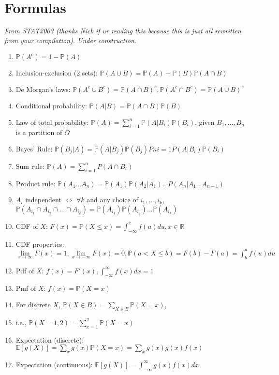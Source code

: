 \chapter{Formulas}


\textit{From STAT2003 (thanks Nick if ur reading this because this is just all rewritten from your compilation). Under construction.}

\begin{enumerate}
    \item \(\mathbb{P}(A^c)=1-\mathbb{P}(A)\)
    \item Inclusion-exclusion (2 sets): \(\mathbb{P}(A\cup B)=\mathbb{P}(A)+\mathbb{P}(B)\mathbb{P}(A\cap B)\)
    \item De Morgan’s laws: \(\mathbb{P}(A^c\cup B^c)=\mathbb{P}{(A\cap B)}^c, \mathbb{P}(A^c\cap B^c)=\mathbb{P}{(A\cup B)}^c\)
    \item Conditional probability: \(\mathbb{P}(A|B)=\mathbb{P}(A\cap B)\mathbb{P}(B)\)
    \item Law of total probability: \(\mathbb{P}(A)=\sum_{i=1}^n \mathbb{P}(A|B_i)\mathbb{P}(B_i)\), given \(B_1, \ldots,B_n\) is a partition of \(\Omega\)
    \item Bayes’ Rule: \(\mathbb{P}(B_j|A)=\mathbb{P}(A|B_j)\mathbb{P}(B_j)Pni=1P(A|B_i)\mathbb{P}(B_i)\)
    \item Sum rule: \(\mathbb{P}(A)=\sum_{i=1}^n P(A\cap B_i)\)
    \item Product rule: \(\mathbb{P}(A_1 \ldots A_n) = \mathbb{P}(A_1) \mathbb{P}(A_2|A_1) \ldots P(A_n | A_1\ldots A_{n-1})\)
    \item \(A_i\) independent \(\iff\) \(\forall k\) and any choice of \(i_1,\ldots,i_k\), \(\mathbb{P}(A_{i_1} \cap A_{i_2} \cap\ldots \cap A_{i_k})=\mathbb{P}(A_{i_1})\mathbb{P}(A_{i_2})\ldots\mathbb{P}(A_{i_k})\)
    \item CDF of \(X\): \(F(x)=\mathbb{P}(X\leq x)=\int_{-\infty}^{x} f(u)du, x\in \mathbb{R}\)
    \item CDF properties: \(\underset{x\to\infty}{\lim} F(x)=1, \underset{x\to-\infty}{\lim} F(x)=0, \mathbb{P}(a<X\leq b)=F(b)- F(a) = \int_b^a f(u)du\)
    \item Pdf of \(X\): \(f(x)=F'(x), \int_{-\infty}^{\infty} f(x)dx=1\)
    \item Pmf of \(X\): \(f(x)=\mathbb{P}(X=x)\)
    \item For discrete \(X\), \(\mathbb{P}(X\in B)= \sum_{X\in B} \mathbb{P}(X=x)\),
        \item i.e., \(\mathbb{P}(X={1,2})=\sum_{x=1}^2 \mathbb{P}(X=x)\)
    \item Expectation (discrete): \(\mathbb{E}[g(X)] =\sum_x g(x)\mathbb{P}(X=x)=\sum_x g(x) g(x)f(x)\)
    \item Expectation (continuous): \(\mathbb{E}[g(X)] = \int_{-\infty}^{\infty} g(x)f(x)dx\)
\end{enumerate}

